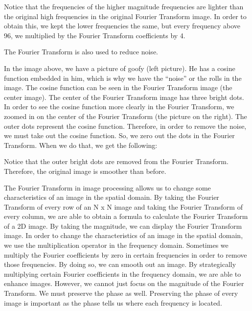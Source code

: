 \documentclass [../article.tex]{subfiles}
\begin{document}
  Notice that the frequencies of the higher magnitude frequencies
  are lighter than the original high frequencies in the original
  Fourier Transform image.  In order to obtain this, we kept the
  lower frequencies the same, but every frequency above 96, we
  multiplied by the Fourier Transform coefficients by 4.

  The Fourier Transform is also used to reduce noise.

  In the image above, we have a picture of goofy (left picture).  He
  has a cosine function embedded in him, which is why we have the
  “noise” or the rolls in the image. The cosine function can be seen
  in the Fourier Transform image (the center image).  The center of
  the Fourier Transform image has three bright dots.  In order to
  see the cosine function more clearly in the Fourier Transform, we
  zoomed in on the center of the Fourier Transform (the picture on
  the right).  The outer dots represent the cosine function.
  Therefore, in order to remove the noise, we must take out the
  cosine function.  So, we zero out the dots in the Fourier
  Transform.  When we do that, we get the following:

  Notice that the outer bright dots are removed from the Fourier
  Transform.  Therefore, the original image is smoother than before.

  The Fourier Transform in image processing allows us to change some
  characteristics of an image in the spatial domain.  By taking the 
  Fourier Transform of every row of an N x N image and taking the 
  Fourier Transform of every column, we are able to obtain a formula 
  to calculate the Fourier Transform of a 2D image.  By taking the 
  magnitude, we can display the Fourier Transform image.  In order 
  to change the characteristics of an image in the spatial domain, 
  we use the multiplication operator in the frequency domain. 
  Sometimes we multiply the Fourier coefficients by zero in certain 
  frequencies in order to remove those frequencies.  By doing so, we 
  can smooth out an image.  By strategically multiplying certain 
  Fourier coefficients in the frequency domain, we are able to 
  enhance images.  However, we cannot just focus on the magnitude of 
  the Fourier Transform.  We must preserve the phase as well.  
  Preserving the phase of every image is important as the phase 
  tells us where each frequency is located. 
\end{document}
